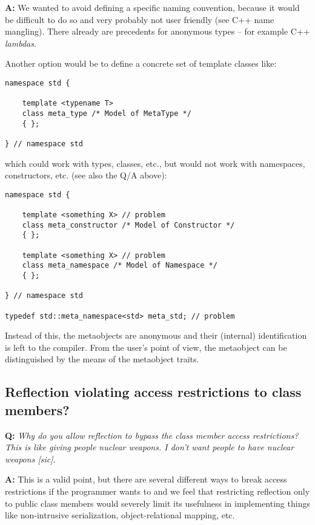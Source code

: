 \textbf{A:} We wanted to avoid defining a specific naming convention, because it would
be difficult to do so and very probably not user friendly (see C++ name mangling). There
already are precedents for anonymous types -- for example C++ {\em lambdas}.

Another option would be to define a concrete set of template classes like:

\begin{verbatim}
namespace std {

	template <typename T>
	class meta_type /* Model of MetaType */
	{ };

} // namespace std
\end{verbatim}

which could work with types, classes, etc., but would not work with namespaces,
constructors, etc. (see also the Q/A above):

\begin{verbatim}
namespace std {

	template <something X> // problem
	class meta_constructor /* Model of Constructor */
	{ };

	template <something X> // problem
	class meta_namespace /* Model of Namespace */
	{ };

} // namespace std

typedef std::meta_namespace<std> meta_std; // problem
\end{verbatim}

Instead of this, the metaobjects are anonymous and their (internal) identification
is left to the compiler. From the user's point of view, the metaobject can be distinguished
by the means of the metaobject traits.

\subsection{Reflection violating access restrictions to class members?}

\textbf{Q:} {\em Why do you allow reflection to bypass the class member access
restrictions? This is like giving people nuclear weapons. I don't want people
to have nuclear weapons [sic].}

\textbf{A:}
This is a valid point, but there are several different ways to break access restrictions
if the programmer wants to and we feel that restricting reflection only to public
class members would severely limit its usefulness in implementing things like
non-intrusive serialization, object-relational mapping, etc.

